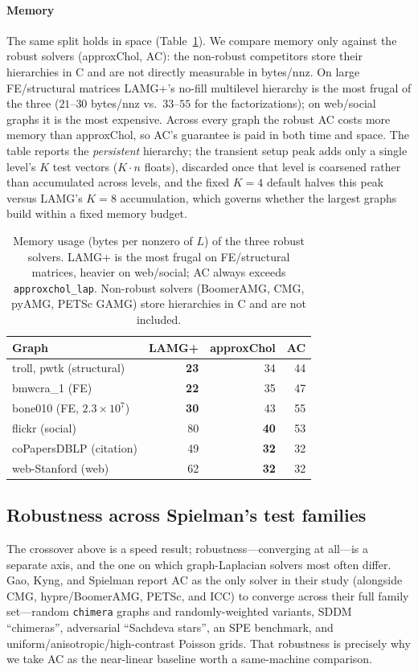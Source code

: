 \documentclass[review]{siamart220329}
\begin{document}
\paragraph{Memory} The same split holds in space (Table~\ref{tab:memory}). We compare memory only
against the robust solvers (approxChol, AC): the non-robust competitors store their hierarchies in
C and are not directly measurable in bytes/nnz. On large FE/structural matrices LAMG+'s no-fill
multilevel hierarchy is the most frugal of the three ($21$--$30$ bytes/nnz vs.\
$33$--$55$ for the factorizations); on web/social graphs it is the most expensive. Across every graph the robust AC costs more memory than
approxChol, so AC's guarantee is paid in both time and space. The table
reports the \emph{persistent} hierarchy; the transient setup peak adds only a single level's
$K$ test vectors ($K{\cdot}n$ floats), discarded once that level is coarsened rather than accumulated
across levels, and the fixed $K{=}4$ default halves this peak versus LAMG's $K{=}8$
accumulation, which governs whether the largest graphs build within a fixed memory budget.

\begin{table}[t]\centering
\caption{Memory usage (bytes per nonzero of $L$) of the three robust solvers.
LAMG+ is the most frugal on FE/structural matrices, heavier on web/social; AC always
exceeds \texttt{approxchol\_lap}. Non-robust solvers (BoomerAMG, CMG, pyAMG, PETSc GAMG)
store hierarchies in C and are not included.}\label{tab:memory}
\begin{tabular}{lrrr}
\toprule
Graph & LAMG+ & approxChol & AC\\
\midrule
troll, pwtk (structural)   & \textbf{23} & 34 & 44\\
bmwcra\_1 (FE)             & \textbf{22} & 35 & 47\\
bone010 (FE, $2.3\!\times\!10^7$) & \textbf{30} & 43 & 55\\
flickr (social)            & 80 & \textbf{40} & 53\\
coPapersDBLP (citation)    & 49 & \textbf{32} & 32\\
web-Stanford (web)         & 62 & \textbf{32} & 32\\
\bottomrule
\end{tabular}
\end{table}

\subsection{Robustness across Spielman's test families}\label{sec:families}
The crossover above is a speed result; robustness---converging at all---is a separate axis, and the
one on which graph-Laplacian solvers most often differ. Gao, Kyng, and Spielman \cite{gks2023}
report AC as the only solver in their study (alongside CMG, hypre/BoomerAMG, PETSc, and ICC) to
converge across their full family set---random \texttt{chimera} graphs and randomly-weighted
variants, SDDM ``chimeras'', adversarial ``Sachdeva stars'', an SPE benchmark, and
uniform/anisotropic/high-contrast Poisson grids. That robustness is precisely why we take AC as the
near-linear baseline worth a same-machine comparison.
\end{document}
